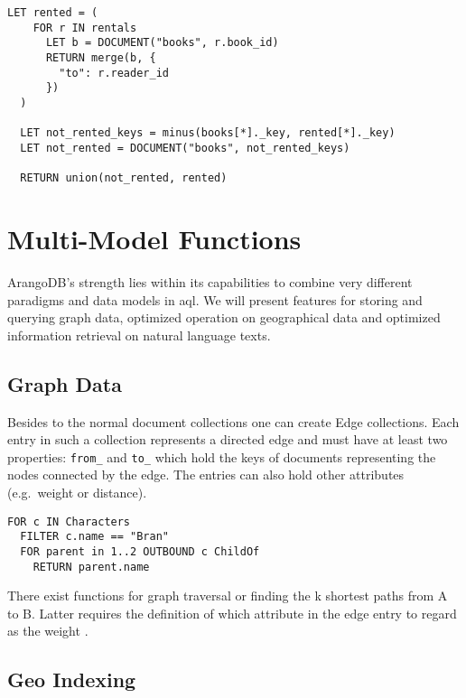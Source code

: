\begin{lstlisting}[language=ArangoQL,label={lst:graph},caption={Return all books and for those which are rented, to whom they are}]
  LET rented = (
    FOR r IN rentals
      LET b = DOCUMENT("books", r.book_id)
      RETURN merge(b, {
        "to": r.reader_id
      })
  )

  LET not_rented_keys = minus(books[*]._key, rented[*]._key)
  LET not_rented = DOCUMENT("books", not_rented_keys)

  RETURN union(not_rented, rented)
\end{lstlisting}

\section{Multi-Model Functions}

ArangoDB's strength lies within its capabilities to combine very different paradigms and data models in \gls{aql}. We will present features for storing and querying graph data, optimized operation on geographical data and optimized information retrieval on natural language texts.

\subsection{Graph Data}

Besides to the normal document collections one can create Edge collections. Each entry in such a collection represents a directed edge and must have at least two properties: \texttt{from\_} and \texttt{to\_} which hold the keys of documents representing the nodes connected by the edge. The entries can also hold other attributes (e.g.\ weight or distance). 


\begin{lstlisting}[language=ArangoQL,label={lst:graph},caption={Combining graph and relational data: Looks for a character and uses out-going edges of type \texttt{ChildOf} (= incoming edges of type \texttt{ParentOf}) to determine the character's parents and grandparents.}]
FOR c IN Characters
  FILTER c.name == "Bran"
  FOR parent in 1..2 OUTBOUND c ChildOf
    RETURN parent.name
\end{lstlisting}

There exist functions for graph traversal or finding the k shortest paths from A to B. Latter requires the definition of which attribute in the edge entry to regard as the weight \parencite{ShortestPath}.

\subsection{Geo Indexing}

